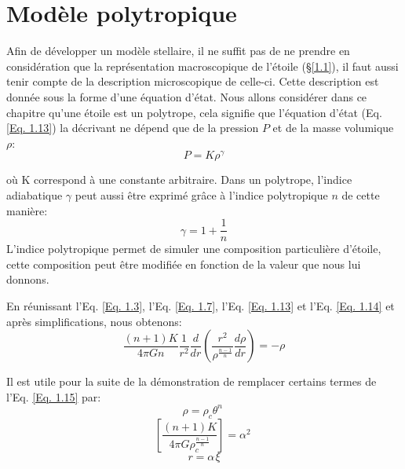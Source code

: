 \section{Modèle polytropique}\label{1.2}

Afin de développer un modèle stellaire, il ne suffit pas de ne prendre en considération que la représentation macroscopique de l'étoile (§\ref{1.1}), il faut aussi tenir compte de la description microscopique de celle-ci. Cette description est donnée sous la forme d'une équation d'état. Nous allons considérer dans ce chapitre qu'une étoile est un polytrope, cela signifie que l'équation d'état (Eq. \ref{Eq. 1.13}) la décrivant ne dépend que de la pression $P$ et de la masse volumique $\rho$:\begin{equation}P=K\rho^{\gamma}\label{Eq. 1.13}\end{equation}

où K correspond à une constante arbitraire. Dans un polytrope, l'indice adiabatique $\gamma$ peut aussi être exprimé grâce à l'indice polytropique $n$ de cette manière:\begin{equation}\gamma=1+\dfrac{1}{n}\label{Eq. 1.14}\end{equation} L'indice polytropique permet de simuler une composition particulière d'étoile, cette composition peut être modifiée en fonction de la valeur que nous lui donnons. \bigskip

En réunissant l'Eq. \ref{Eq. 1.3}, l'Eq. \ref{Eq. 1.7}, l'Eq. \ref{Eq. 1.13} et l'Eq. \ref{Eq. 1.14} et après simplifications, nous obtenons:\begin{equation}\dfrac{(n+1)K}{4\pi Gn}\dfrac{1}{r^{2}}\dfrac{d}{dr}\left( \dfrac{r^{2}}{\rho^{\frac{n-1}{n}}}\dfrac{d\rho}{dr}\right) =-\rho\label{Eq. 1.15}\end{equation}

\vfill
{}




Il est utile pour la suite de la démonstration de remplacer certains termes de l'Eq. \ref{Eq. 1.15} par:
\begin{equation}\rho=\rho_{c} \theta^{n}\hspace{3pt}\label{Eq. 1.16}\end{equation}
\begin{equation}\left[\dfrac{(n+1)K}{4\pi G\rho^{\frac{n-1}{n}}_{c}}\right]=\alpha^{2}\hspace{3pt}\label{Eq. 1.17}\end{equation} 
\begin{equation}r=\alpha\hspace{1pt}\xi\label{Eq. 1.18}\end{equation}

